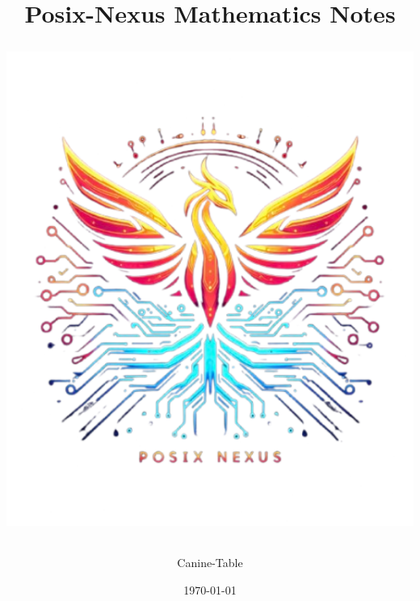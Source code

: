 \documentclass[a4paper,12pt]{article}
\begin{document}
\title{
		\hspace{24px}\textbf{Posix-Nexus Mathematics Notes}\hspace{23px}\\[10mm]
		\begin{NexMainBox}[dark, shpA,fit, width=\linewidth/2]
			\includegraphics[width=\textwidth]{img/posix-nexus.png}
		\end{NexMainBox}
	}
	\author{Canine-Table}
	\date{\today}
	\maketitle
	\newpage
	\label{top}
	\begin{NexMainBox}[light, title=Contents, hdrB, breakable]
		\thispagestyle{plain}
		\tableofcontents
	\end{NexMainBox}
	\newpage
	
	
	
	
	
	
	
	
	
	
	
	
\end{document}
